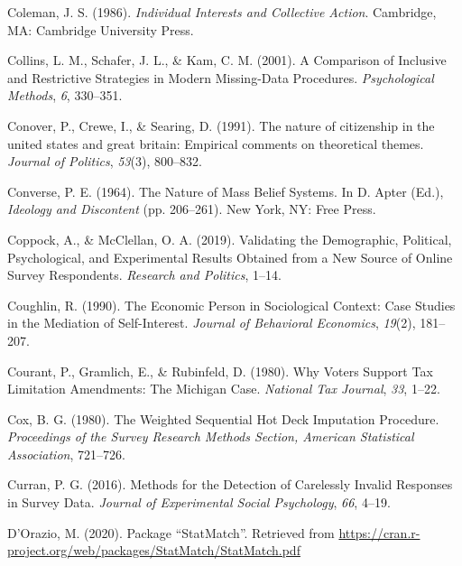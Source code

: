 \documentclass[12pt,econ]{sources/authesis}
\newenvironment{CSLReferences}%
  {}%
  {\par}
\begin{document}
\begin{CSLReferences}{1}{0}
\leavevmode{}%
Coleman, J. S. (1986). \emph{{Individual Interests and Collective Action}}. Cambridge, MA: Cambridge University Press.

\leavevmode{}%
Collins, L. M., Schafer, J. L., \& Kam, C. M. (2001). {A Comparison of Inclusive and Restrictive Strategies in Modern Missing-Data Procedures}. \emph{Psychological Methods}, \emph{6}, 330--351.

\leavevmode{}%
Conover, P., Crewe, I., \& Searing, D. (1991). The nature of citizenship in the united states and great britain: Empirical comments on theoretical themes. \emph{Journal of Politics}, \emph{53}(3), 800--832.

\leavevmode{}%
Converse, P. E. (1964). The {Nature} of {Mass} {Belief} {Systems}. In D. Apter (Ed.), \emph{Ideology and {Discontent}} (pp. 206--261). New York, NY: Free Press.

\leavevmode{}%
Coppock, A., \& McClellan, O. A. (2019). {Validating the Demographic, Political, Psychological, and Experimental Results Obtained from a New Source of Online Survey Respondents}. \emph{Research and Politics}, 1--14.

\leavevmode{}%
Coughlin, R. (1990). The {Economic} {Person} in {Sociological} {Context}: {Case} {Studies} in the {Mediation} of {Self}-{Interest}. \emph{Journal of Behavioral Economics}, \emph{19}(2), 181--207.

\leavevmode{}%
Courant, P., Gramlich, E., \& Rubinfeld, D. (1980). Why {Voters} {Support} {Tax} {Limitation} {Amendments}: {The} {Michigan} {Case}. \emph{National Tax Journal}, \emph{33}, 1--22.

\leavevmode{}%
Cox, B. G. (1980). {The Weighted Sequential Hot Deck Imputation Procedure}. \emph{Proceedings of the Survey Research Methods Section, American Statistical Association}, 721--726.

\leavevmode{}%
Curran, P. G. (2016). {Methods for the Detection of Carelessly Invalid Responses in Survey Data}. \emph{Journal of Experimental Social Psychology}, \emph{66}, 4--19.

\leavevmode{}%
D'Orazio, M. (2020). {Package {``StatMatch''}}. Retrieved from \url{https://cran.r-project.org/web/packages/StatMatch/StatMatch.pdf}


\end{CSLReferences}
\end{document}
